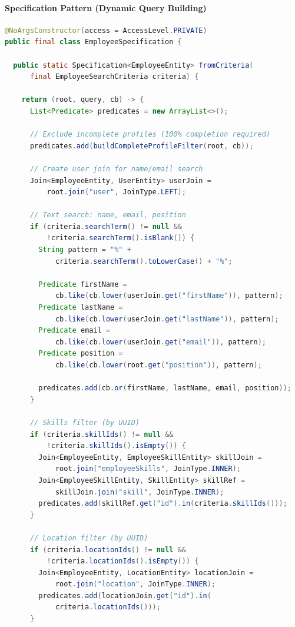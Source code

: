 \paragraph{Specification Pattern (Dynamic Query Building)}\mbox{}\vspace{4pt}

\begin{lstlisting}[language=Java, caption=EmployeeSpecification - JPA Criteria API, label=lst:employee_specification]
@NoArgsConstructor(access = AccessLevel.PRIVATE)
public final class EmployeeSpecification {

  public static Specification<EmployeeEntity> fromCriteria(
      final EmployeeSearchCriteria criteria) {
    
    return (root, query, cb) -> {
      List<Predicate> predicates = new ArrayList<>();

      // Exclude incomplete profiles (100% completion required)
      predicates.add(buildCompleteProfileFilter(root, cb));

      // Create user join for name/email search
      Join<EmployeeEntity, UserEntity> userJoin = 
          root.join("user", JoinType.LEFT);

      // Text search: name, email, position
      if (criteria.searchTerm() != null && 
          !criteria.searchTerm().isBlank()) {
        String pattern = "%" + 
            criteria.searchTerm().toLowerCase() + "%";

        Predicate firstName = 
            cb.like(cb.lower(userJoin.get("firstName")), pattern);
        Predicate lastName = 
            cb.like(cb.lower(userJoin.get("lastName")), pattern);
        Predicate email = 
            cb.like(cb.lower(userJoin.get("email")), pattern);
        Predicate position = 
            cb.like(cb.lower(root.get("position")), pattern);

        predicates.add(cb.or(firstName, lastName, email, position));
      }

      // Skills filter (by UUID)
      if (criteria.skillIds() != null && 
          !criteria.skillIds().isEmpty()) {
        Join<EmployeeEntity, EmployeeSkillEntity> skillJoin =
            root.join("employeeSkills", JoinType.INNER);
        Join<EmployeeSkillEntity, SkillEntity> skillRef = 
            skillJoin.join("skill", JoinType.INNER);
        predicates.add(skillRef.get("id").in(criteria.skillIds()));
      }

      // Location filter (by UUID)
      if (criteria.locationIds() != null && 
          !criteria.locationIds().isEmpty()) {
        Join<EmployeeEntity, LocationEntity> locationJoin = 
            root.join("location", JoinType.INNER);
        predicates.add(locationJoin.get("id").in(
            criteria.locationIds()));
      }


\end{lstlisting}
